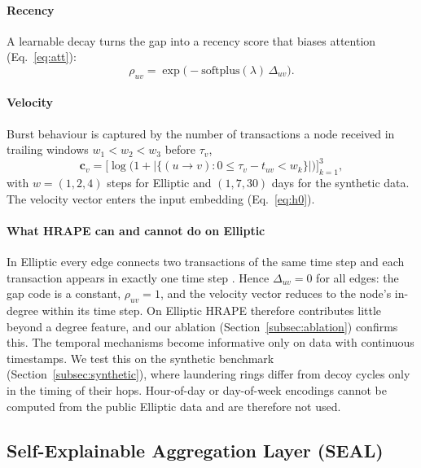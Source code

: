 \paragraph{Recency} A learnable decay turns the gap into a recency score that biases attention (Eq.~\ref{eq:att}):
\begin{equation}
\rho_{uv}=\exp\!\big(-\mathrm{softplus}(\lambda)\,\Delta_{uv}\big).
\label{eq:recency}
\end{equation}

\paragraph{Velocity} Burst behaviour is captured by the number of transactions a node received in trailing windows $w_1<w_2<w_3$ before $\tau_v$,
\begin{equation}
\mathbf{c}_v=\Big[\log\big(1+|\{(u\to v): 0\le \tau_v-t_{uv}<w_k\}|\big)\Big]_{k=1}^{3},
\label{eq:velocity}
\end{equation}
with $w=(1,2,4)$ steps for Elliptic and $(1,7,30)$ days for the synthetic data. The velocity vector enters the input embedding (Eq.~\ref{eq:h0}).

\paragraph{What HRAPE can and cannot do on Elliptic} In Elliptic every edge connects two transactions of the same time step and each transaction appears in exactly one time step \citep{weber2019anti}. Hence $\Delta_{uv}=0$ for all edges: the gap code is a constant, $\rho_{uv}=1$, and the velocity vector reduces to the node's in-degree within its time step. On Elliptic HRAPE therefore contributes little beyond a degree feature, and our ablation (Section~\ref{subsec:ablation}) confirms this. The temporal mechanisms become informative only on data with continuous timestamps. We test this on the synthetic benchmark (Section~\ref{subsec:synthetic}), where laundering rings differ from decoy cycles only in the timing of their hops. Hour-of-day or day-of-week encodings cannot be computed from the public Elliptic data and are therefore not used.

\subsection{Self-Explainable Aggregation Layer (SEAL)}
\label{subsec:seal}

